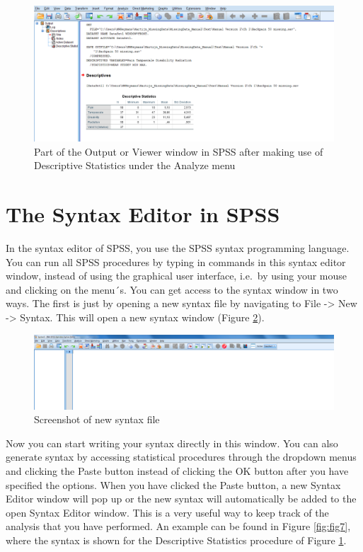 \documentclass[]{book}
\begin{document}
\begin{figure}

{\centering \includegraphics[width=0.9\linewidth]{images/fig1.5} 

}

\caption{Part of the Output or Viewer window in SPSS after making use of Descriptive Statistics under the Analyze menu}\label{fig:fig5}
\end{figure}

\section{The Syntax Editor in SPSS}\label{the-syntax-editor-in-spss}

In the syntax editor of SPSS, you use the SPSS syntax programming
language. You can run all SPSS procedures by typing in commands in this
syntax editor window, instead of using the graphical user interface,
i.e.~by using your mouse and clicking on the menu´s. You can get access
to the syntax window in two ways. The first is just by opening a new
syntax file by navigating to File -\textgreater{} New -\textgreater{}
Syntax. This will open a new syntax window (Figure \ref{fig:fig6}).

\begin{figure}

{\centering \includegraphics[width=0.9\linewidth]{images/fig1.6} 

}

\caption{Screenshot of new syntax file}\label{fig:fig6}
\end{figure}

Now you can start writing your syntax directly in this window. You can
also generate syntax by accessing statistical procedures through the
dropdown menus and clicking the Paste button instead of clicking the OK
button after you have specified the options. When you have clicked the
Paste button, a new Syntax Editor window will pop up or the new syntax
will automatically be added to the open Syntax Editor window. This is a
very useful way to keep track of the analysis that you have performed.
An example can be found in Figure \ref{fig:fig7}, where the syntax is
shown for the Descriptive Statistics procedure of Figure \ref{fig:fig5}.
\end{document}

